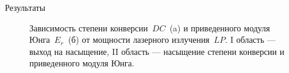 \documentclass[aspectratio=169]{beamer}
\begin{document}
\begin{frame}{Результаты}
\begin{figure}
            \caption*{Зависимость степени конверсии~$DC$~(a) и приведенного модуля Юнга~$E_r$~(б) от мощности лазерного излучения~$LP$. I область --- выход  на насыщение, II область --- насыщение степени конверсии и приведенного модуля Юнга.}
        \end{figure}

\end{frame}
\end{document}
